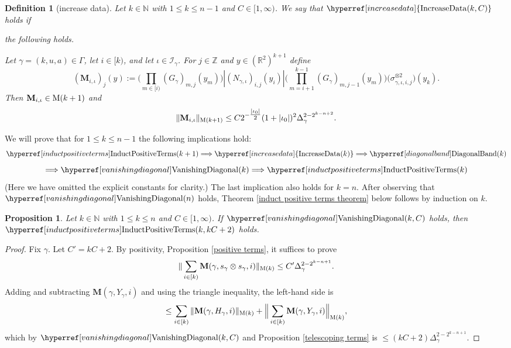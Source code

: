 \documentclass[12pt,reqno]{amsart}
\theoremstyle{plain}
\newtheorem{proposition}[theorem]{Proposition}
\newtheorem{definition}[theorem]{Definition}
\numberwithin{equation}{section}
\theoremstyle{remark}
\newcommand{\using}[1]{}
\newcommand{\N}{{\mathbb N}}
\newcommand{\M}{\mathbf{M}}
\begin{document}
\newcommand{\IncreaseData}[1]{{\hyperref[increase data]{{\rm IncreaseData}(#1)}}}
\begin{definition}[increase data]\label{increase data}
Let $k\in \N$ with $1\le k\le n-1$ and $C\in [1,\infty)$.
We say that $\IncreaseData{k,C}$ holds if

the following holds.

Let $\gamma=(k,u,a)\in \Gamma$, let $i\in [k)$, and let
$\iota\in\mathcal{I}_{\gamma}$.
For $j\in\mathbb Z$ and $y\in(\mathbb R^2)^{k+1}$ define
\begin{equation}\label{auto:increased-data-kernel}
    (\M_{i,\iota})_j(y):=
    \Big(\prod_{m\in [i)} (G_\gamma)_{m,j}(y_m)\Big)
    |(N_{\gamma,\iota})_{i,j}(y_i)|
    \Big(\prod_{m=i+1}^{k-1} (G_\gamma)_{m,j-1}(y_m)\Big)
    \bigl(\sigma_{\gamma,\iota,i,j}^{\otimes 2}\bigr)(y_{k}) .
\end{equation}
Then $\M_{i,\iota}\in {\rm M}(k+1)$ and
\begin{equation}\label{auto:increased-data-M-norm-bound}
  \|\M_{i,\iota}\|_{{\rm M}(k+1)}
  \le
  C 2^{-\tfrac{|\iota_0|}{2}}(1+|\iota_0|)^2
  \Delta_\gamma^{2-2^{k-n+2}} .
\end{equation}
\end{definition}
We will prove that for $1\le k\le n-1$ the following implications hold:
\begin{equation}\label{auto:induction-implication-chain-first} \InductPositiveTerms{k+1} \Longrightarrow \IncreaseData{k} \Longrightarrow \DiagonalBand{k} \end{equation}
\begin{equation}\label{auto:induction-implication-chain-second} \Longrightarrow \VanishingDiagonal{k} \Longrightarrow \InductPositiveTerms{k} \end{equation}
(Here we have omitted the explicit constants for clarity.)
The last implication also holds for $k=n$. After observing that $\VanishingDiagonal{n}$ holds,
Theorem \ref{induct positive terms theorem} below follows by induction on $k$.

\begin{proposition}
\label{vanishing diagonal implies induct positive terms}\using{positive terms}\using{telescoping terms}
Let $k\in\N$ with $1\le k\le n$ and $C\in [1,\infty)$.
If $\VanishingDiagonal{k,C}$ holds, then $\InductPositiveTerms{k,kC+2}$ holds.
\end{proposition}

\begin{proof}
Fix $\gamma$. Let $C'=kC+2$.
By  positivity, Proposition \ref{positive terms}, it suffices to prove
\begin{equation}
    \|\sum_{i\in [k)} \M(\gamma,s_\gamma \otimes s_\gamma,i)\|_{{\rm M}(k)}\le C' \Delta_\gamma^{2-2^{k-n+1}}.
\end{equation}
Adding and subtracting $\M(\gamma, Y_\gamma, i)$ and using the triangle inequality, the left-hand side is
\[
\le \sum_{i\in [k)} \|\M(\gamma, H_\gamma,i)\|_{{\rm M}(k)} + \Big\|\sum_{i\in [k)} \M(\gamma, Y_\gamma,i)\Big\|_{{\rm M}(k)},
\]
which by $\VanishingDiagonal{k,C}$ and Proposition \ref{telescoping terms} is
$\le (kC+2) \Delta_\gamma^{2-2^{k-n+1}}$.
\end{proof}
\end{document}
